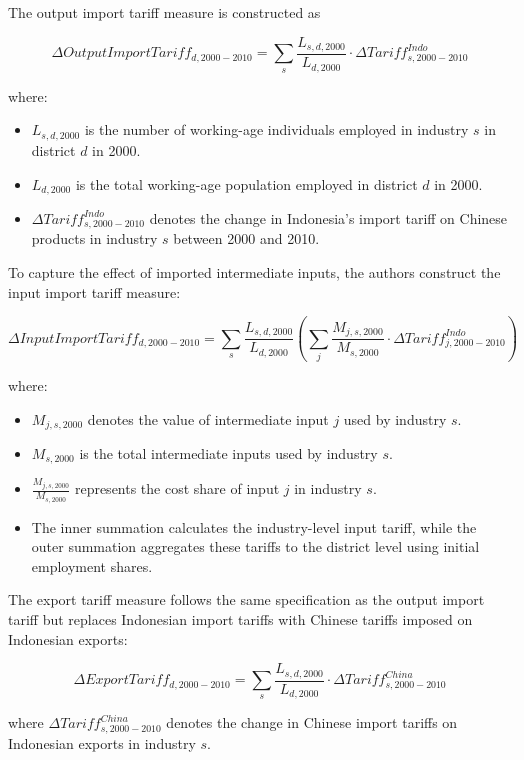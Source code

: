 \documentclass[
  manuscript=article,
  layout=publish,
  year=2026,
  volume=1,
]{den}
\providecommand{\tightlist}{%
  \setlength{\itemsep}{0pt}\setlength{\parskip}{0pt}}
\begin{document}
The output import tariff measure is constructed as

\[
\Delta OutputImportTariff_{d,2000-2010}
=
\sum_{s}
\frac{L_{s,d,2000}}{L_{d,2000}}
\cdot
\Delta Tariff^{Indo}_{s,2000-2010}
\]

where:

\begin{itemize}
\tightlist
\item
  \(L_{s,d,2000}\) is the number of working-age individuals employed in
  industry \(s\) in district \(d\) in 2000.
\item
  \(L_{d,2000}\) is the total working-age population employed in
  district \(d\) in 2000.
\item
  \(\Delta Tariff^{Indo}_{s,2000-2010}\) denotes the change in
  Indonesia's import tariff on Chinese products in industry \(s\)
  between 2000 and 2010.
\end{itemize}

To capture the effect of imported intermediate inputs, the authors
construct the input import tariff measure:

\[
\Delta InputImportTariff_{d,2000-2010}
=
\sum_{s}
\frac{L_{s,d,2000}}{L_{d,2000}}
\left(
\sum_{j}
\frac{M_{j,s,2000}}{M_{s,2000}}
\cdot
\Delta Tariff^{Indo}_{j,2000-2010}
\right)
\]

where:

\begin{itemize}
\tightlist
\item
  \(M_{j,s,2000}\) denotes the value of intermediate input \(j\) used by
  industry \(s\).
\item
  \(M_{s,2000}\) is the total intermediate inputs used by industry
  \(s\).
\item
  \(\frac{M_{j,s,2000}}{M_{s,2000}}\) represents the cost share of input
  \(j\) in industry \(s\).
\item
  The inner summation calculates the industry-level input tariff, while
  the outer summation aggregates these tariffs to the district level
  using initial employment shares.
\end{itemize}

The export tariff measure follows the same specification as the output
import tariff but replaces Indonesian import tariffs with Chinese
tariffs imposed on Indonesian exports:

\[
\Delta ExportTariff_{d,2000-2010}
=
\sum_{s}
\frac{L_{s,d,2000}}{L_{d,2000}}
\cdot
\Delta Tariff^{China}_{s,2000-2010}
\]

where \(\Delta Tariff^{China}_{s,2000-2010}\) denotes the change in
Chinese import tariffs on Indonesian exports in industry \(s\).
\end{document}
